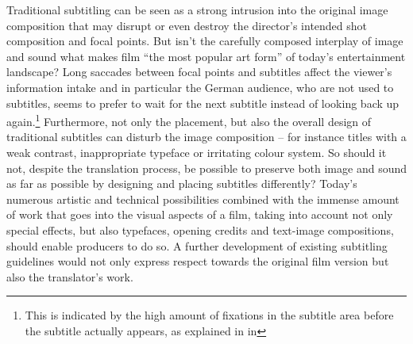 \documentclass[output=paper]{langsci/langscibook}
\begin{document}
Traditional subtitling can be seen as a strong intrusion into the original image composition that may disrupt or even destroy the director's intended shot composition and focal points. But isn't the carefully composed interplay of image and sound what makes film ``the most popular art form'' \citep[35]{mercado2010} of today's entertainment landscape? Long saccades between focal points and subtitles affect the viewer's information intake and in particular the German audience, who are not used to subtitles, seems to prefer to wait for the next subtitle instead of looking back up again.\footnote{This is indicated by the high amount of fixations in the subtitle area before the subtitle actually appears, as explained in  in } Furthermore, not only the placement, but also the overall design of traditional subtitles can disturb the image composition -- for instance titles with a weak contrast, inappropriate typeface or irritating colour system. So should it not, despite the translation process, be possible to preserve both image and sound as far as possible by designing and placing subtitles differently? Today's numerous artistic and technical possibilities combined with the immense amount of work that goes into the visual aspects of a film, taking into account not only special effects, but also typefaces, opening credits and text-image compositions, should enable producers to do so. A further development of existing subtitling guidelines would not only express respect towards the original film version but also the translator's work.
\end{document}
